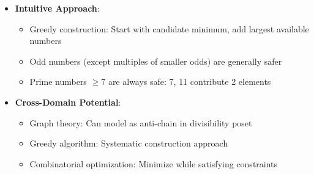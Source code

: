 \documentclass[12pt]{article}
\begin{document}
\begin{problemconfigbox}
\begin{itemize}[leftmargin=*]
    \item \textbf{Intuitive Approach}:
    \begin{itemize}
        \item Greedy construction: Start with candidate minimum, add largest available numbers
        \item Odd numbers (except multiples of smaller odds) are generally safer
        \item Prime numbers $\geq 7$ are always safe: 7, 11 contribute 2 elements
    \end{itemize}
    
    \item \textbf{Cross-Domain Potential}:
    \begin{itemize}
        \item Graph theory: Can model as anti-chain in divisibility poset
        \item Greedy algorithm: Systematic construction approach
        \item Combinatorial optimization: Minimize while satisfying constraints
    \end{itemize}
\end{itemize}
\end{problemconfigbox}
\end{document}

